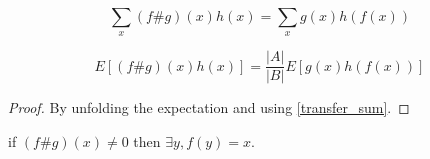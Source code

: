 \begin{proposition}
    \label{transfer_sum}
    \leanok
    $$\sum_x {(f \# g) (x) h(x)} = \sum_x {g(x) h(f(x))}$$
\end{proposition}

\begin{lemma}
    \label{transfer_expect}
    \leanok
    $$E[(f \# g) (x) h(x)] = \frac{|A|}{|B|} E[g(x) h(f(x))]$$
\end{lemma}

\begin{proof}
    \leanok
    By unfolding the expectation and using \ref{transfer_sum}.
\end{proof}


\begin{proposition}
    \label{transfer_ne_zero}
    \leanok
    if $(f \# g) (x) \neq 0$ then $\exists y, f(y) = x$.
\end{proposition}